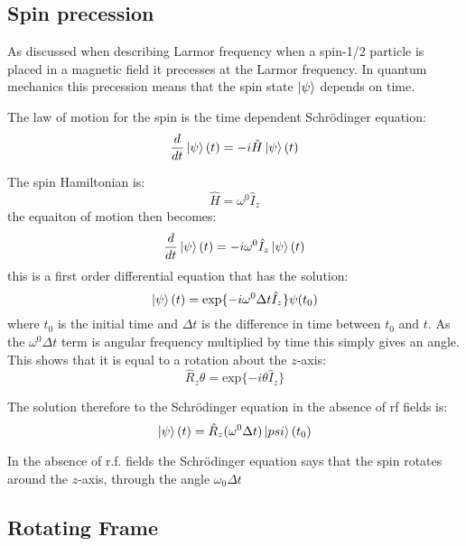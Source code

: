 \subsection{Spin precession}

 As discussed when describing Larmor frequency when a spin-1/2 particle is placed in
 a magnetic field it precesses at the Larmor frequency. In quantum mechanics this precession
 means that the spin state $\ket{\psi}$ depends on time.

 The law of motion for the spin is the time dependent Schr\"odinger equation:
 \begin{equation}
   \frac{d}{dt}\ket{\psi}(t) = -i\hat{H}\ket{\psi}(t)
 \end{equation}

  The spin Hamiltonian is:
  \begin{equation}
    \hat{H} = \omega^0\hat{I}_z
  \end{equation}
the equaiton of motion then becomes:
\begin{equation}
  \frac{d}{dt}\ket{\psi}(t) = -i\omega^0\hat{I}_z\ket{\psi}(t)
\end{equation}
this is a first order differential equation that has the solution:
\begin{equation}
  \ket{\psi}(t) = \text{exp}\{-i\omega^0\Delta{t}\hat{I}_z\}{\psi}(t_0)
\end{equation}
where $t_0$ is the initial time and $\Delta{t}$ is the difference in time
between $t_0$ and $t$. As the $\omega^0\Delta{t}$ term is angular frequency multiplied by
time this simply gives an angle. This shows that it is equal to a rotation about the $z$-axis:
\begin{equation}
  \hat{R}_z{\theta} = \text{exp}\{-i\theta\hat{I}_z\}
\end{equation}

The solution therefore to the Schr\"odinger equation in the absence of rf fields is:
\begin{equation}
  \ket{\psi}(t) = \hat{R}_z(\omega^0\Delta{t})\ket{psi}(t_0)
\end{equation}

In the absence of r.f. fields the Schr\"odinger equation says that the spin rotates
around the $z$-axis, through the angle $\omega_0\Delta{t}$

\subsection{Rotating Frame}

